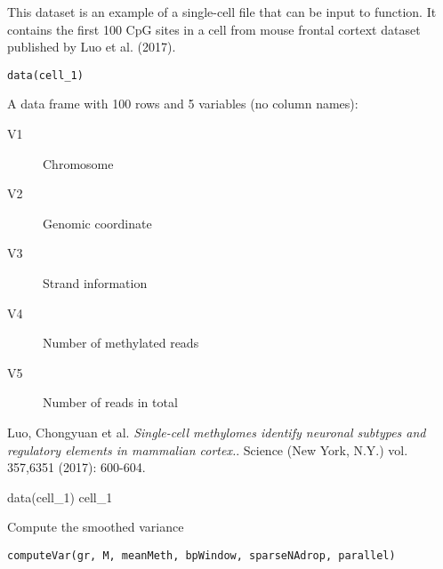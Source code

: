 \documentclass[letterpaper]{book}
\begin{document}
%
\begin{Description}
This dataset is an example of a single-cell file that can be input to
 function. It contains the first 100 CpG sites in
a cell from mouse frontal cortext dataset published by Luo et al. (2017).
\end{Description}
%
\begin{Usage}
\begin{verbatim}
data(cell_1)
\end{verbatim}
\end{Usage}
%
\begin{Format}
A data frame with 100 rows and 5 variables (no column names):
\begin{description}

\item[V1] Chromosome
\item[V2] Genomic coordinate
\item[V3] Strand information
\item[V4] Number of methylated reads
\item[V5] Number of reads in total

\end{description}

\end{Format}
%
\begin{References}
Luo, Chongyuan et al. \emph{Single-cell methylomes identify neuronal
subtypes and regulatory elements in mammalian cortex.}. Science (New York, N.Y.)
vol. 357,6351 (2017): 600-604.
\end{References}
%
\begin{Examples}
\begin{ExampleCode}
data(cell_1)
cell_1

\end{ExampleCode}
\end{Examples}
%
\begin{Description}
Compute the smoothed variance
\end{Description}
%
\begin{Usage}
\begin{verbatim}
computeVar(gr, M, meanMeth, bpWindow, sparseNAdrop, parallel)
\end{verbatim}
\end{Usage}
%
\end{document}

